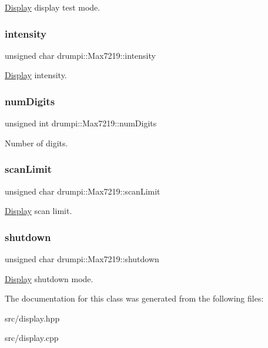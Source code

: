 \hyperlink{classdrumpi_1_1Display}{Display} display test mode. \mbox{\label{classdrumpi_1_1Max7219_a22aa789cc1ac84c6c5df7ad59607afed}} 
\subsubsection{\texorpdfstring{intensity}{intensity}}
{\footnotesize\ttfamily unsigned char drumpi\+::\+Max7219\+::intensity\hspace{0.3cm}{\ttfamily [private]}}

\hyperlink{classdrumpi_1_1Display}{Display} intensity. \mbox{\label{classdrumpi_1_1Max7219_a71d7054477a82db272fb5c584576f25a}} 
\subsubsection{\texorpdfstring{num\+Digits}{numDigits}}
{\footnotesize\ttfamily unsigned int drumpi\+::\+Max7219\+::num\+Digits\hspace{0.3cm}{\ttfamily [private]}}

Number of digits. \mbox{\label{classdrumpi_1_1Max7219_a605af97de38c0f8fd581ba17e6ce4f37}} 
\subsubsection{\texorpdfstring{scan\+Limit}{scanLimit}}
{\footnotesize\ttfamily unsigned char drumpi\+::\+Max7219\+::scan\+Limit\hspace{0.3cm}{\ttfamily [private]}}

\hyperlink{classdrumpi_1_1Display}{Display} scan limit. \mbox{\label{classdrumpi_1_1Max7219_a0b1b2c31442fe9a3a1db3cdae5dd32e8}} 
\subsubsection{\texorpdfstring{shutdown}{shutdown}}
{\footnotesize\ttfamily unsigned char drumpi\+::\+Max7219\+::shutdown\hspace{0.3cm}{\ttfamily [private]}}

\hyperlink{classdrumpi_1_1Display}{Display} shutdown mode. 

The documentation for this class was generated from the following files\+:\begin{DoxyCompactItemize}
\item 
src/display.\+hpp\item 
src/display.\+cpp\end{DoxyCompactItemize}
